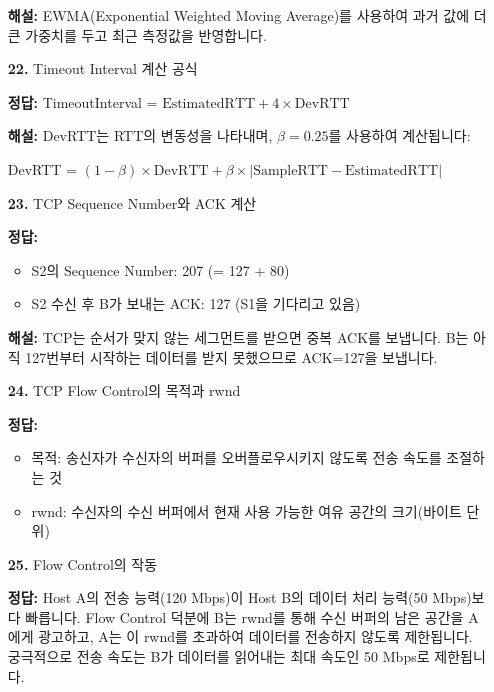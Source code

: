 \documentclass[a4paper, 10pt]{article}
\begin{document}
\begin{enumerate}[itemsep=2.5em, leftmargin=2em, label={}]
\small\textbf{해설:} EWMA(Exponential Weighted Moving Average)를 사용하여 과거 값에 더 큰 가중치를 두고 최근 측정값을 반영합니다.

\item[\textbf{22.}] Timeout Interval 계산 공식
\vspace{0.5em}

\noindent\textbf{정답:} TimeoutInterval = $\text{EstimatedRTT} + 4 \times \text{DevRTT}$

\small\textbf{해설:} DevRTT는 RTT의 변동성을 나타내며, $\beta = 0.25$를 사용하여 계산됩니다:

DevRTT = $(1-\beta) \times \text{DevRTT} + \beta \times |\text{SampleRTT} - \text{EstimatedRTT}|$

\item[\textbf{23.}] TCP Sequence Number와 ACK 계산
\vspace{0.5em}

\noindent\textbf{정답:}
\begin{itemize}[itemsep=0.3em]
    \item S2의 Sequence Number: 207 (= 127 + 80)
    \item S2 수신 후 B가 보내는 ACK: 127 (S1을 기다리고 있음)
\end{itemize}

\small\textbf{해설:} TCP는 순서가 맞지 않는 세그먼트를 받으면 중복 ACK를 보냅니다. B는 아직 127번부터 시작하는 데이터를 받지 못했으므로 ACK=127을 보냅니다.

\item[\textbf{24.}] TCP Flow Control의 목적과 rwnd
\vspace{0.5em}

\noindent\textbf{정답:}
\begin{itemize}[itemsep=0.3em]
    \item 목적: 송신자가 수신자의 버퍼를 오버플로우시키지 않도록 전송 속도를 조절하는 것
    \item rwnd: 수신자의 수신 버퍼에서 현재 사용 가능한 여유 공간의 크기(바이트 단위)
\end{itemize}

\item[\textbf{25.}] Flow Control의 작동
\vspace{0.5em}

\noindent\textbf{정답:} Host A의 전송 능력(120 Mbps)이 Host B의 데이터 처리 능력(50 Mbps)보다 빠릅니다. Flow Control 덕분에 B는 rwnd를 통해 수신 버퍼의 남은 공간을 A에게 광고하고, A는 이 rwnd를 초과하여 데이터를 전송하지 않도록 제한됩니다. 궁극적으로 전송 속도는 B가 데이터를 읽어내는 최대 속도인 50 Mbps로 제한됩니다.


\end{enumerate}
\end{document}

